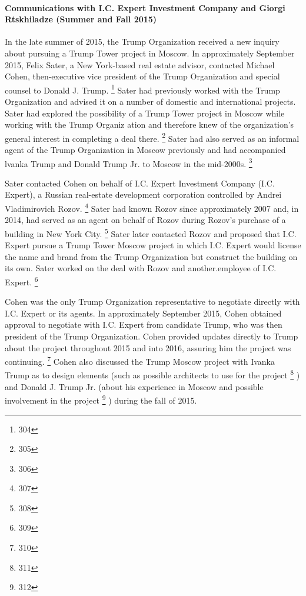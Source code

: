 \paragraph{Communications with I.C. Expert Investment Company and Giorgi Rtskhiladze (Summer and Fall 2015)}

In the late summer of 2015, the Trump Organization received a new inquiry about pursuing a Trump Tower project in Moscow.
In approximately September 2015, Felix Sater, a New York-based real estate advisor, contacted Michael Cohen, then-executive vice president of the Trump Organization and special counsel to Donald J. Trump.%
\footnote{304}
Sater had previously worked with the Trump Organization and advised it on a number of domestic and international projects.
Sater had explored the possibility of a Trump Tower project in Moscow while working with the Trump Organiz ation and therefore knew of the organization's general interest in completing a deal there.%
\footnote{305}
Sater had also served as an informal agent of the Trump Organization in Moscow previously and had accompanied lvanka Trump and Donald Trump Jr. to Moscow in the mid-2000s.%
\footnote{306}

Sater contacted Cohen on behalf of I.C. Expert Investment Company (I.C. Expert), a Russian real-estate development corporation controlled by Andrei Vladimirovich Rozov.%
\footnote{307}
Sater had known Rozov since approximately 2007 and, in 2014, had served as an agent on behalf of Rozov during Rozov's purchase of a building in New York City.%
\footnote{308}
Sater later contacted Rozov and proposed that I.C. Expert pursue a Trump Tower Moscow project in which I.C. Expert would license the name and brand from the Trump Organization but construct the building on its own.
Sater worked on the deal with Rozov and another.employee of I.C. Expert.%
\footnote{309}

Cohen was the only Trump Organization representative to negotiate directly with I.C. Expert or its agents.
In approximately September 2015, Cohen obtained approval to negotiate with I.C. Expert from candidate Trump, who was then president of the Trump Organization.
Cohen provided updates directly to Trump about the project throughout 2015 and into 2016, assuring him the project was continuing.%
\footnote{310}
Cohen also discussed the Trump Moscow project with Ivanka Trump as to design elements (such as possible architects to use for the project%
\footnote{311}
) and Donald J. Trump Jr. (about his experience in Moscow and possible involvement in the project%
\footnote{312}
) during the fall of 2015.

